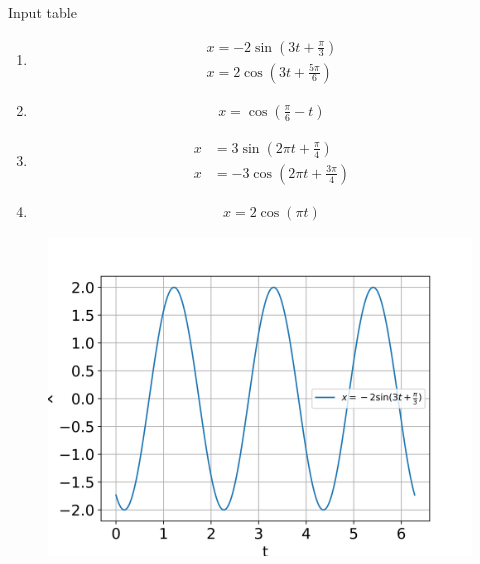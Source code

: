 \documentclass[journal,12pt,twocolumn]{IEEEtran}
\theoremstyle{remark}
\begin{document}
\begin{table}[htbp]
    \centering
    \setlength{\extrarowheight}{5pt}
    
    \caption{Input table}
    \label{tab:parameter_table.11.14.12.analog}
\end{table}
\begin{enumerate}[label=\roman*)]
\item \begin{align}
    x = -2 \sin\left(3t + \frac{\pi}{3}\right)\\
   x =2\cos\left(3t+\frac{5\pi}{6}\right)
\end{align}
\begin{figure}[!htbp]
    
\end{figure}
\item \begin{align}
    x = \cos\left(\frac{\pi}{6} - t\right)
\end{align}
\begin{figure}[!htbp]
    
\end{figure}

\item \begin{align}
    x &= 3 \sin\left(2\pi t + \frac{\pi}{4}\right)\\
    x &= -3\cos\left(2\pi t + \frac{3\pi}{4}\right)
\end{align}
\begin{figure}[!htbp]
    
\end{figure}

\item 
\begin{align}
    x = 2 \cos(\pi t)
\end{align}
\begin{figure}[!htbp]
    
\end{figure}

\end{enumerate}

\begin{figure}[ht]
    \centering
    \includegraphics[width = \columnwidth]{figs/Figure_1.png}
    \caption{}
\end{figure}
\end{document}
